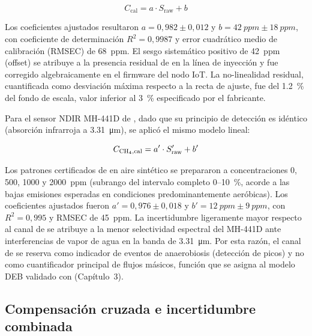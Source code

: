 \begin{equation}
C_{\text{cal}} = a \cdot S_{\text{raw}} + b
\label{eq:calibracion_lineal_co2}
\end{equation}

Los coeficientes ajustados resultaron $a = 0{,}982 \pm 0{,}012$ y $b = \SI{42}{ppm} \pm \SI{18}{ppm}$, con coeficiente de determinación $R^2 = 0{,}9987$ y error cuadrático medio de calibración (RMSEC) de \SI{68}{ppm}. El sesgo sistemático positivo de \SI{42}{ppm} (offset) se atribuye a la presencia residual de  en la línea de inyección y fue corregido algebraicamente en el firmware del nodo IoT. La no-linealidad residual, cuantificada como desviación máxima respecto a la recta de ajuste, fue del \SI{1.2}{\percent} del fondo de escala, valor inferior al \SI{3}{\percent} especificado por el fabricante.

Para el sensor NDIR MH-441D de , dado que su principio de detección es idéntico (absorción infrarroja a \SI{3,31}{\micro\metre}), se aplicó el mismo modelo lineal:

\begin{equation}
C_{\ce{CH4},\text{cal}} = a' \cdot S'_{\text{raw}} + b'
\label{eq:calibracion_lineal_ch4}
\end{equation}

Los patrones certificados de  en aire sintético se prepararon a concentraciones \num{0}, \num{500}, \num{1000} y \num{2000}~ppm (subrango del intervalo completo 0--\SI{10}{\percent}, acorde a las bajas emisiones esperadas en condiciones predominantemente aeróbicas). Los coeficientes ajustados fueron $a' = 0{,}976 \pm 0{,}018$ y $b' = \SI{12}{ppm} \pm \SI{9}{ppm}$, con $R^2 = 0{,}995$ y RMSEC de \SI{45}{ppm}. La incertidumbre ligeramente mayor respecto al canal de  se atribuye a la menor selectividad espectral del MH-441D ante interferencias de vapor de agua en la banda de \SI{3,31}{\micro\metre}. Por esta razón, el canal de  se reserva como indicador de eventos de anaerobiosis (detección de picos) y no como cuantificador principal de flujos másicos, función que se asigna al modelo DEB validado con  (Capítulo~3).

\subsection{Compensación cruzada e incertidumbre combinada}
\label{subsec:cap2_incertidumbre}


